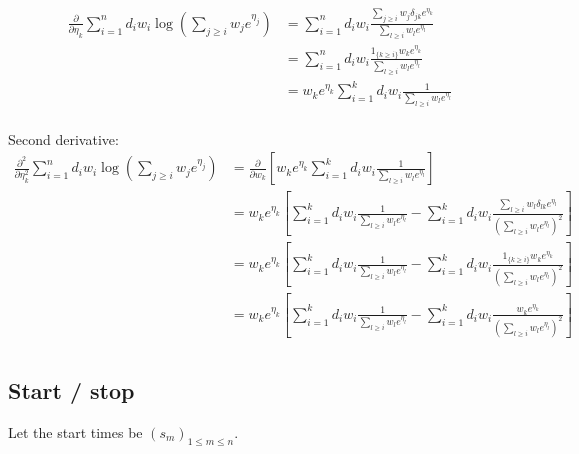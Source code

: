 \documentclass{article}
\begin{document}
\begin{equation}
\begin{aligned}
   \frac{\partial}{\partial \eta_k} \sum_{i = 1}^n d_i w_i \log \left(\sum_{j \geq i} w_j e^{\eta_j}\right) 
   &= \sum_{i=1}^n d_i w_i \frac{ \sum_{j \geq i} w_j \delta_{jk} e^{\eta_k}} 
   {\sum_{l \geq i} w_l e^{\eta_l}} \\
   &= \sum_{i=1}^n d_i w_i \frac{ 1_{\{k \geq i\}} w_k e^{\eta_k}} 
   {\sum_{l \geq i} w_l e^{\eta_l}} \\
   &= w_k e^{\eta_k} \sum_{i=1}^k d_i w_i \frac{ 1} 
   {\sum_{l \geq i} w_l e^{\eta_l}} \\
   \end{aligned}
\end{equation}



Second derivative:
\begin{equation}
\begin{aligned}
   \frac{\partial^2}{\partial \eta_k^2} \sum_{i = 1}^n d_i w_i \log \left(\sum_{j \geq i} w_j e^{\eta_j}\right) 
&= \frac{\partial}{\partial w_k} \left[w_k e^{\eta_k} \sum_{i=1}^k d_i w_i \frac{ 1} 
   {\sum_{l \geq i} w_l e^{\eta_l}} \right] \\
   &= w_k e^{\eta_k} \left[\sum_{i=1}^k d_i w_i \frac{ 1} 
   {\sum_{l \geq i} w_l e^{\eta_l}} - \sum_{i=1}^k d_i w_i \frac{ \sum_{l \geq i} w_l \delta_{lk} e^{\eta_l}} 
   {(\sum_{l \geq i} w_l e^{\eta_l})^2} \right] \\
    &= w_k e^{\eta_k} \left[\sum_{i=1}^k d_i w_i \frac{ 1} 
   {\sum_{l \geq i} w_l e^{\eta_l}} - \sum_{i=1}^k d_i w_i \frac{ 1_{\{k \geq i\}} w_k e^{\eta_k}} 
   {(\sum_{l \geq i} w_l e^{\eta_l})^2} \right] \\
      &= w_k e^{\eta_k} \left[\sum_{i=1}^k d_i w_i \frac{ 1} 
   {\sum_{l \geq i} w_l e^{\eta_l}} - \sum_{i=1}^k d_i w_i \frac{  w_k e^{\eta_k}} 
   {(\sum_{l \geq i} w_l e^{\eta_l})^2} \right] \\
   \end{aligned}
\end{equation}

\subsection{Start / stop}

 Let the start times be $(s_m)_{1 \leq m \leq n}$. 
\end{document}
